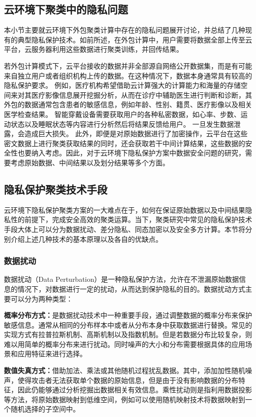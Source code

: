 \subsection{云环境下聚类中的隐私问题}
本小节主要就云环境下外包聚类计算中存在的隐私问题展开讨论，并总结了几种现有的典型隐私保护技术。如前所述，在外包计算中，用户需要将数据全部上传至云平台，云服务器利用这些数据进行聚类训练，并回传结果。

若外包计算模式下，云平台接收的数据并非全部源自网络公开数据集，而是有可能来自独立用户或者组织机构上传的数据。在这种情况下，数据本身通常具有较高的隐私保护要求。
例如，医疗机构希望借助云计算强大的计算能力和海量的存储空间来对其医疗影像信息展开挖掘分析，从而在诊疗中辅助医生进行判断和诊断，其外包的数据通常包含患者的敏感信息，例如年龄、性别、籍贯、医疗影像以及相关医学检查结果。
智能穿戴设备需要获取用户的各种私密数据，如心率、步数、运动状态以及睡眠状态等内容进行分析然后将结果反馈给用户。
一旦发生数据泄露，会造成巨大损失。
此外，即便是对原始数据进行了加密操作，云平台在这些密文数据上进行聚类获取结果的同时，还会获取若干中间计算结果，这些数据的安全性也要纳入考虑。因此，对于云环境下隐私保护方案中数据安全问题的研究，需要考虑原始数据、中间结果以及划分结果等多个方面。

\subsection{隐私保护聚类技术手段}
云环境下隐私保护聚类方案的一大难点在于，如何在保证原始数据以及中间结果隐私性的前提下，完成安全高效的聚类运算。当下，聚类研究中常见的隐私保护技术手段大体上可以分为数据扰动、差分隐私、同态加密以及安全多方计算。本节将分别介绍上述几种技术的基本原理以及各自的优缺点。

\subsubsection{数据扰动}
数据扰动（Data Perturbation）是一种隐私保护方法，允许在不泄漏原始数据信息的情况下，对数据进行一定的扰动，从而达到保护隐私的目的。数据扰动方式主要可以分为两种类型：

\begin{compactitem}
	\item \textbf{概率分布方式：}是数据扰动技术中一种重要手段，通过调整数据的概率分布来保护敏感信息。通常从相同的分布样本中或者从分布本身中获取数据进行替换。常见的实现方式有拉普拉斯机制、高斯机制以及指数机制。但是若数据分布比较复杂，则难以用简单的概率分布来进行扰动。同时噪声的大小和分布需要根据具体的应用场景和应用特征来进行选择。
	\item \textbf{数值失真方式：}借助加法、乘法或其他随机过程扰乱数据。其中，添加加性随机噪声，使得攻击者无法获取单个数据的原始信息，但是由于没有影响数据的分布特征，因此仍能够通过分析挖掘出数据相关有效信息。乘性扰动则是指利用数据投影等方法，将原始数据映射到低维空间，例如可以使用随机映射技术将数据映射到一个随机选择的子空间中。
\end{compactitem}


